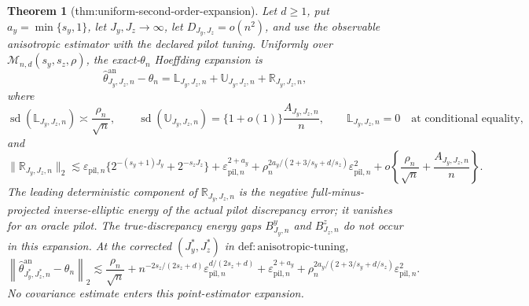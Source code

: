\documentclass{article}
\newtheorem{theorem}{Theorem}
\begin{document}
\begin{theorem}[thm:uniform-second-order-expansion]\label{thm:uniform-second-order-expansion}
Let \(d\ge1\), put \(a_y=\min\{s_y,1\}\), let \(J_y,J_z\to\infty\), let \(D_{J_y,J_z}=o(n^2)\), and use the observable anisotropic estimator with the declared pilot tuning. Uniformly over \(\mathcal M_{n,d}(s_y,s_z,\rho)\), the exact-\(\theta_n\) Hoeffding expansion is
\[
\widehat\theta^{\mathrm{an}}_{J_y,J_z,n}-\theta_n
=\mathbb L_{J_y,J_z,n}+\mathbb U_{J_y,J_z,n}+\mathbb R_{J_y,J_z,n},
\]
where
\[
\operatorname{sd}(\mathbb L_{J_y,J_z,n})\asymp\frac{\rho_n}{\sqrt n},
\qquad
\operatorname{sd}(\mathbb U_{J_y,J_z,n})=\{1+o(1)\}\frac{A_{J_y,J_z,n}}n,
\qquad
\mathbb L_{J_y,J_z,n}=0
\quad\text{at conditional equality},
\]
and
\[
\|\mathbb R_{J_y,J_z,n}\|_2
\lesssim
\varepsilon_{\mathrm{pil},n}\{2^{-(s_y+1)J_y}+2^{-s_zJ_z}\}
+\varepsilon_{\mathrm{pil},n}^{2+a_y}
+\rho_n^{2a_y/(2+3/s_y+d/s_z)}\varepsilon_{\mathrm{pil},n}^2
+o\!\left\{\frac{\rho_n}{\sqrt n}+\frac{A_{J_y,J_z,n}}n\right\}.
\]
The leading deterministic component of \(\mathbb R_{J_y,J_z,n}\) is the negative full-minus-projected inverse-elliptic energy of the actual pilot discrepancy error; it vanishes for an oracle pilot.  The true-discrepancy energy gaps \(B^y_{J_y,n}\) and \(B^z_{J_z,n}\) do not occur in this expansion. At the corrected \((J_y^*,J_z^*)\) in \(\mathrm{def{:}anisotropic\text{-}tuning}\),
\[
\left\|\widehat\theta^{\mathrm{an}}_{J_y^*,J_z^*,n}-\theta_n\right\|_2
\lesssim
\frac{\rho_n}{\sqrt n}
+n^{-2s_z/(2s_z+d)}\varepsilon_{\mathrm{pil},n}^{d/(2s_z+d)}
+\varepsilon_{\mathrm{pil},n}^{2+a_y}
+\rho_n^{2a_y/(2+3/s_y+d/s_z)}\varepsilon_{\mathrm{pil},n}^2.
\]
No covariance estimate enters this point-estimator expansion.
\end{theorem}
\end{document}
